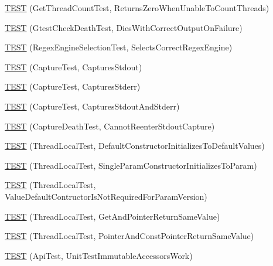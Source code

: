 \begin{DoxyCompactItemize}
\item 
\hyperlink{namespacetesting_1_1internal_a5ad8299ae9325382f01b945f4f81711e}{\-T\-E\-S\-T} (\-Get\-Thread\-Count\-Test, \-Returns\-Zero\-When\-Unable\-To\-Count\-Threads)
\item 
\hyperlink{namespacetesting_1_1internal_afabff70df09a0e4fcda96dd36460c2b9}{\-T\-E\-S\-T} (\-Gtest\-Check\-Death\-Test, \-Dies\-With\-Correct\-Output\-On\-Failure)
\item 
\hyperlink{namespacetesting_1_1internal_a198f7132f76dd44d48dac54dc5d38fbb}{\-T\-E\-S\-T} (\-Regex\-Engine\-Selection\-Test, \-Selects\-Correct\-Regex\-Engine)
\item 
\hyperlink{namespacetesting_1_1internal_a0b658d88cea3a2fe6775b1b269c0204b}{\-T\-E\-S\-T} (\-Capture\-Test, \-Captures\-Stdout)
\item 
\hyperlink{namespacetesting_1_1internal_abbc9510a4f690912c32835213d95198f}{\-T\-E\-S\-T} (\-Capture\-Test, \-Captures\-Stderr)
\item 
\hyperlink{namespacetesting_1_1internal_a341ff65f3ca44b27fc51f03a9a05bee8}{\-T\-E\-S\-T} (\-Capture\-Test, \-Captures\-Stdout\-And\-Stderr)
\item 
\hyperlink{namespacetesting_1_1internal_a325a786fb22b87e5aa8d8f584b42ab09}{\-T\-E\-S\-T} (\-Capture\-Death\-Test, \-Cannot\-Reenter\-Stdout\-Capture)
\item 
\hyperlink{namespacetesting_1_1internal_af366e28e373f36480decc2ea586f48f0}{\-T\-E\-S\-T} (\-Thread\-Local\-Test, \-Default\-Constructor\-Initializes\-To\-Default\-Values)
\item 
\hyperlink{namespacetesting_1_1internal_a5a52dd578217050e621ebd2aace97a70}{\-T\-E\-S\-T} (\-Thread\-Local\-Test, \-Single\-Param\-Constructor\-Initializes\-To\-Param)
\item 
\hyperlink{namespacetesting_1_1internal_a6dffc8331590224259b60e855ad07d03}{\-T\-E\-S\-T} (\-Thread\-Local\-Test, \-Value\-Default\-Contructor\-Is\-Not\-Required\-For\-Param\-Version)
\item 
\hyperlink{namespacetesting_1_1internal_a0e7c2d58a313bec0821df19f44351d84}{\-T\-E\-S\-T} (\-Thread\-Local\-Test, \-Get\-And\-Pointer\-Return\-Same\-Value)
\item 
\hyperlink{namespacetesting_1_1internal_aaed45d6ba960f02e8d3d042c606bc98e}{\-T\-E\-S\-T} (\-Thread\-Local\-Test, \-Pointer\-And\-Const\-Pointer\-Return\-Same\-Value)
\item 
\hyperlink{namespacetesting_1_1internal_a9ac879683abb06d1c0bba3a339ea2f40}{\-T\-E\-S\-T} (\-Api\-Test, \-Unit\-Test\-Immutable\-Accessors\-Work)

\end{DoxyCompactItemize}
